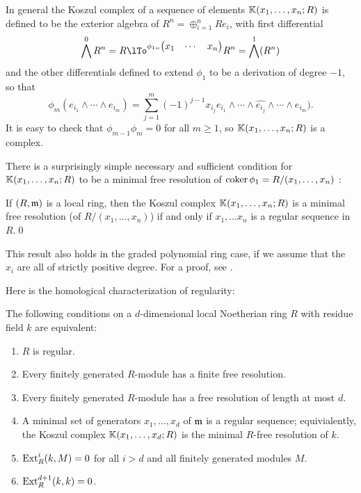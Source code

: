 \begin{example}
In general the Koszul complex of a sequence of elements
$\KK(x_{1}, \dots, x_{n}; R)$ is defined to be the exterior algebra of $R^{n}= \oplus_{i=1}^{n} Re_{i}$, with first differential
$$
\bigwedge^{0}R^{n} = R \lTo ^{
\phi_{1 = }\begin{pmatrix}
 x_{1}&\cdots&x_{n} 
\end{pmatrix}
}
R^{n}=\bigwedge^{1}(R^{n}) 
$$
and the other differentials defined to extend $\phi_{1}$ to be a derivation of degree $-1$, so that 
$$
\phi_{m}(e_{i_1}\wedge \cdots \wedge e_{i_{m}})
= \sum_{j= 1}^{m} (-1)^{j-1}x_{i_{j}} e_{i_{1}}\wedge\cdots \wedge \widehat{e_{i_{j}}}\wedge \cdots \wedge e_{i_{m}}).
$$
It is easy to check that $\phi_{m-1}\phi_{m} = 0$ for all $m\geq 1$, so $\KK(x_{1}, \dots, x_{n}; R)$ is a complex.

There is a surprisingly simple necessary and sufficient condition for 
$\KK(x_{1}, \dots, x_{n};R)$
to be a minimal free resolution of $\coker \phi_{1} = R/(x_{1}, \dots, x_{n})$ \cite[]{E}:

\begin{theorem} If $(R,\gm)$ is a local ring, then
 the Koszul complex $\KK(x_{1}, \dots, x_{n};R)$ is a minimal free resolution (of $R/(x_{1}, \dots, x_{n})$) if and only if 
$x_{1},\dots x_{n}$ is a regular sequence in $R$.\qed
\end{theorem}
This result also holds in the graded polynomial ring case, if we assume that the $x_{i}$ are all of
strictly positive degree. For a proof, see \cite[Theorem 17.6]{E}.
\end{example}


Here is the homological characterization of regularity:

% 

\begin{theorem}\label{regularity characterized}\label{ABS}
The following conditions on a $d$-dimensional local Noetherian ring $R$ with residue field $k$ are equivalent:
\begin{enumerate}
 \item $R$ is regular.
\item Every finitely generated $R$-module has a finite free resolution.
\item Every finitely generated $R$-module has a  free resolution of length at most $d$.
\item A minimal set of generators $x_{1},\dots, x_{d}$ of $\gm$ is a regular sequence; equivialently,
the Koszul complex $\KK(x_{1},\dots, x_{d};R)$ is the minimal  $R$-free resolution of  $k$.
\item $\Ext_R^{i}(k,M) = 0$ for all $i>d$ and all finitely generated modules $M$.
\item $\Ext_R^{d+1}(k,k) = 0$.
\end{enumerate}
\end{theorem}

